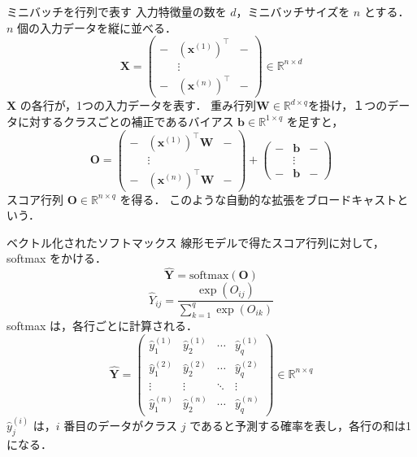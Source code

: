 \documentclass[dvipdfmx,uplatex,11pt]{beamer}
\begin{document}
\begin{frame}{ミニバッチを行列で表す}
入力特徴量の数を $d$，ミニバッチサイズを $n$ とする．
$n$ 個の入力データを縦に並べる．
\[
\mathbf{X}
=
\begin{pmatrix}
- & (\mathbf{x}^{(1)})^\top & -\\
  & \vdots & \\
- & (\mathbf{x}^{(n)})^\top & -
\end{pmatrix}
\in \mathbb{R}^{n \times d}
\]
$\mathbf{X}$ の各行が，1つの入力データを表す．
重み行列$\mathbf{W} \in \mathbb{R}^{d \times q}$を掛け，１つのデータに対するクラスごとの補正であるバイアス $\mathbf{b} \in \mathbb{R}^{1 \times q}$ を足すと，
\[
\mathbf{O}
=
\begin{pmatrix}
- & (\mathbf{x}^{(1)})^\top \mathbf{W} & -\\
  & \vdots & \\
- & (\mathbf{x}^{(n)})^\top \mathbf{W} & -
\end{pmatrix}
+
\begin{pmatrix}
- & \mathbf{b} & -\\
  & \vdots & \\
- & \mathbf{b} & -
\end{pmatrix}
\]
スコア行列 $\mathbf{O} \in \mathbb{R}^{n \times q}$ を得る．
このような自動的な拡張を\alert{ブロードキャスト}という．

\end{frame}


\begin{frame}{ベクトル化されたソフトマックス}
線形モデルで得たスコア行列に対して，softmax をかける．
\[
\hat{\mathbf{Y}}
=
\mathrm{softmax}(\mathbf{O})
\]
\[
\hat{Y}_{ij}
=
\frac{\exp(O_{ij})}
{\sum_{k=1}^{q}\exp(O_{ik})}
\]
softmax は，\alert{各行ごと}に計算される．
\[
\hat{\mathbf{Y}}
=
\begin{pmatrix}
\hat{y}^{(1)}_1 & \hat{y}^{(1)}_2 & \cdots & \hat{y}^{(1)}_q \\
\hat{y}^{(2)}_1 & \hat{y}^{(2)}_2 & \cdots & \hat{y}^{(2)}_q \\
\vdots & \vdots & \ddots & \vdots \\
\hat{y}^{(n)}_1 & \hat{y}^{(n)}_2 & \cdots & \hat{y}^{(n)}_q
\end{pmatrix}
\in \mathbb{R}^{n \times q}
\]
$\hat{y}^{(i)}_j$ は，$i$ 番目のデータがクラス $j$ であると予測する確率を表し，各行の和は1になる．



\end{frame}
\end{document}
